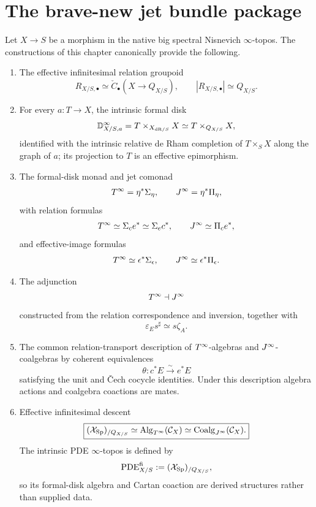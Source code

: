 \section{The brave-new jet bundle package}
\label{sec:jet-final-package}

\begin{theorem}
\label{thm:brave-new-jet-package}
Let $X\to S$ be a morphism in the native big spectral Nisnevich $\infty$-topos.  The constructions of this chapter canonically provide the following.
\begin{enumerate}
\item The effective infinitesimal relation groupoid
\[
    R_{X/S,\bullet}
    \simeq
    \check C_\bullet(X\to Q_{X/S}),
    \qquad
    |R_{X/S,\bullet}|\simeq Q_{X/S}.
\]

\item For every $a:T\to X$, the intrinsic formal disk
\[
    \mathbb D^\infty_{X/S,a}
    =T\times_{X_{\mathrm{dR}/S}}X
    \simeq T\times_{Q_{X/S}}X,
\]
identified with the intrinsic relative de Rham completion of $T\times_SX$ along the graph of $a$; its projection to $T$ is an effective epimorphism.

\item The formal-disk monad and jet comonad
\[
    T^{\infty}=\eta^*\Sigma_\eta,
    \qquad
    J^{\infty}=\eta^*\Pi_\eta,
\]
with relation formulas
\[
    T^{\infty}\simeq\Sigma_ce^*\simeq\Sigma_ec^*,
    \qquad
    J^{\infty}\simeq\Pi_ce^*,
\]
and effective-image formulas
\[
    T^{\infty}\simeq\epsilon^*\Sigma_\epsilon,
    \qquad
    J^{\infty}\simeq\epsilon^*\Pi_\epsilon.
\]

\item The adjunction
\[
    T^{\infty}\dashv J^{\infty}
\]
constructed from the relation correspondence and inversion, together with
\[
    \varepsilon_Es^\sharp\simeq s\zeta_A.
\]

\item The common relation-transport description of $T^{\infty}$-algebras and $J^{\infty}$-coalgebras by coherent equivalences
\[
    \theta:c^*E\xrightarrow{\sim}e^*E
\]
satisfying the unit and \v{C}ech cocycle identities.  Under this description algebra actions and coalgebra coactions are mates.

\item Effective infinitesimal descent
\[
\boxed{
    (\mathcal{X}_{\mathrm{Sp}})_{/Q_{X/S}}
    \simeq
    \operatorname{Alg}_{T^{\infty}}(\mathcal C_X)
    \simeq
    \operatorname{Coalg}_{J^{\infty}}(\mathcal C_X).
}
\]
The intrinsic PDE $\infty$-topos is defined by
\[
    \operatorname{PDE}^{\mathrm{fi}}_{X/S}:=(\mathcal{X}_{\mathrm{Sp}})_{/Q_{X/S}},
\]
so its formal-disk algebra and Cartan coaction are derived structures rather than supplied data.


\end{enumerate}
\end{theorem}
